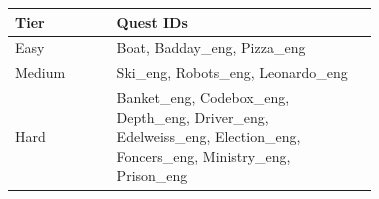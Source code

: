 \begin{tabular}{lp{0.72\linewidth}}
\toprule
Tier & Quest IDs \\
\midrule
Easy & Boat, Badday\_eng, Pizza\_eng \\
Medium & Ski\_eng, Robots\_eng, Leonardo\_eng \\
Hard & Banket\_eng, Codebox\_eng, Depth\_eng, Driver\_eng, Edelweiss\_eng, Election\_eng, Foncers\_eng, Ministry\_eng, Prison\_eng \\
\bottomrule
\end{tabular}
